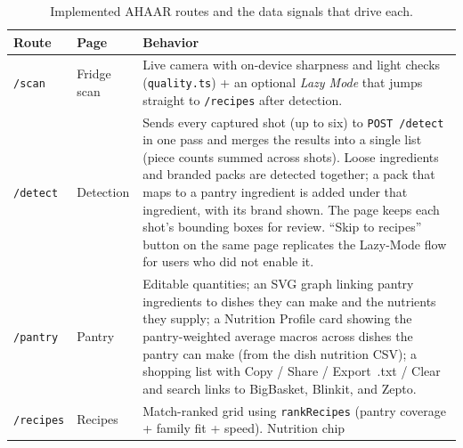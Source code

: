 \documentclass[journal]{IEEEtran}
\begin{document}
\begin{table}[!t]
\caption{Implemented AHAAR routes and the data signals that drive each.}
\label{tab:pages}
\centering
\footnotesize
\begin{tabularx}{\textwidth}{l l X}
\toprule
\textbf{Route} & \textbf{Page} & \textbf{Behavior} \\
\midrule
\texttt{/scan}    & Fridge scan  & Live camera with on-device sharpness and
                                 light checks (\texttt{quality.ts}) + an
                                 optional \textit{Lazy Mode} that jumps
                                 straight to \texttt{/recipes} after
                                 detection. \\
\texttt{/detect}  & Detection    & Sends every captured shot (up to six)
                                 to \texttt{POST /detect} in one pass and
                                 merges the results into a single list
                                 (piece counts summed across shots).
                                 Loose ingredients and branded packs are
                                 detected together; a pack that maps to a
                                 pantry ingredient is added under that
                                 ingredient, with its brand shown. The page
                                 keeps each shot's bounding boxes for
                                 review. ``Skip to recipes''
                                 button on the same page replicates the
                                 Lazy-Mode flow for users who did not
                                 enable it. \\
\texttt{/pantry}  & Pantry       & Editable quantities; an SVG graph
                                 linking pantry ingredients to dishes
                                 they can make and the nutrients they
                                 supply; a Nutrition Profile card showing
                                 the pantry-weighted average macros
                                 across dishes the pantry can make
                                 (from the dish nutrition CSV);
                                 a shopping list with Copy / Share /
                                 Export~.txt / Clear and search links to
                                 BigBasket, Blinkit, and Zepto. \\
\texttt{/recipes} & Recipes      & Match-ranked grid using
                                 \texttt{rankRecipes} (pantry coverage
                                 + family fit + speed). Nutrition chip

\end{tabularx}
\end{table}
\end{document}
